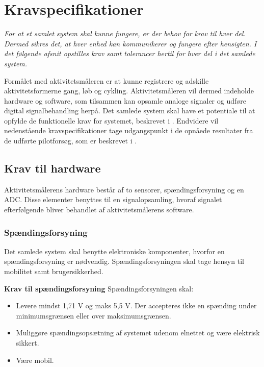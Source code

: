 \section{Kravspecifikationer}
\textit{For at et samlet system skal kunne fungere, er der behov for krav til hver del. Dermed sikres det, at hver enhed kan kommunikerer og fungere efter hensigten. I det følgende afsnit opstilles krav samt tolerancer hertil for hver del i det samlede system.}

Formålet med aktivitetsmåleren er at kunne registrere og adskille aktivitetsformerne gang, løb og cykling. Aktivitetsmåleren vil dermed indeholde hardware og software, som tilsammen kan opsamle analoge signaler og udføre digital signalbehandling herpå. Det samlede system skal have et potentiale til at opfylde de funktionelle krav for systemet, beskrevet i . Endvidere vil nedenstående kravspecifikationer tage udgangspunkt i de opnåede resultater fra de udførte pilotforsøg, som er beskrevet i .

\subsection{Krav til hardware}
Aktivitetsmålerens hardware består af to sensorer, spændingsforsyning og en ADC. Disse elementer benyttes til en signalopsamling, hvoraf signalet efterfølgende bliver behandlet af aktivitetsmålerens software.

\subsubsection{Spændingsforsyning}
Det samlede system skal benytte elektroniske komponenter, hvorfor en spændingsforsyning er nødvendig. Spændingsforsyningen skal tage hensyn til mobilitet samt brugersikkerhed.

\textbf{Krav til spændingsforsyning} \newline 
Spændingsforsyningen skal:
\begin{itemize}
	\item Levere mindst 1,71 V og maks 5,5 V. Der accepteres ikke en spænding under minimumsgrænsen eller over maksimumsgrænsen. %
	\item Muliggøre spændingsopsætning af systemet udenom elnettet og være elektrisk sikkert.
	\item Være mobil.
\end{itemize}

